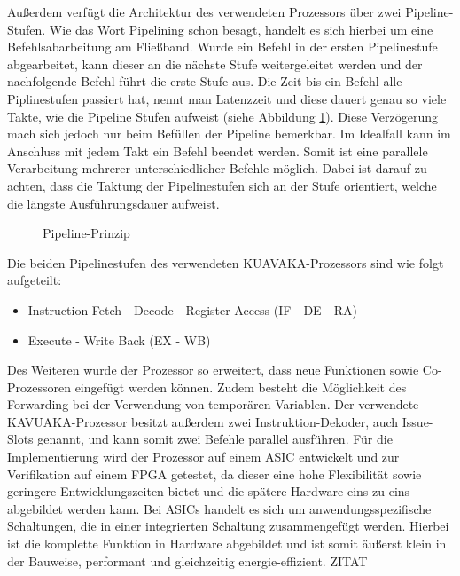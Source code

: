Außerdem verfügt die Architektur des verwendeten Prozessors über zwei Pipeline-Stufen.
Wie das Wort Pipelining schon besagt, handelt es sich hierbei um eine Befehlsabarbeitung am Fließband. Wurde ein Befehl in der ersten Pipelinestufe abgearbeitet, kann dieser an die nächste Stufe weitergeleitet werden und der nachfolgende Befehl führt die erste Stufe aus. Die Zeit bis ein Befehl alle Piplinestufen passiert hat, nennt man Latenzzeit und diese dauert genau so viele Takte, wie die Pipeline Stufen aufweist (siehe Abbildung \ref{fig:pipeline}). Diese Verzögerung mach sich jedoch nur beim Befüllen der Pipeline bemerkbar. Im Idealfall kann im Anschluss mit jedem Takt ein Befehl beendet werden. Somit ist eine parallele Verarbeitung mehrerer unterschiedlicher Befehle möglich. Dabei ist darauf zu achten, dass die Taktung der Pipelinestufen sich an der Stufe orientiert, welche die längste Ausführungsdauer aufweist. \cite[Seite 204]{wust2010mikroprozessortechnik}
	\begin{figure}[H] 
		\centering
		
		\caption{Pipeline-Prinzip}
		\label{fig:pipeline}
	\end{figure}
\newpage
Die beiden Pipelinestufen des verwendeten KUAVAKA-Prozessors sind wie folgt aufgeteilt:
\begin{itemize}
	\item[1.] Instruction Fetch - Decode - Register Access (IF - DE - RA) 
	\item[2.] Execute - Write Back (EX - WB)
\end{itemize}

Des Weiteren wurde der Prozessor so erweitert, dass neue Funktionen sowie Co-Prozessoren eingefügt werden können. Zudem besteht die Möglichkeit des Forwarding bei der Verwendung von temporären Variablen.
Der verwendete KAVUAKA-Prozessor besitzt außerdem zwei Instruktion-Dekoder, auch Issue-Slots genannt, und kann somit zwei Befehle parallel ausführen.
Für die Implementierung wird der Prozessor auf einem ASIC entwickelt und zur Verifikation auf einem FPGA getestet, da dieser eine hohe Flexibilität sowie geringere Entwicklungszeiten bietet und die spätere Hardware eins zu eins abgebildet werden kann.\cite{lukasglitches2017}
Bei ASICs handelt es sich um anwendungsspezifische Schaltungen, die in einer integrierten Schaltung zusammengefügt werden. Hierbei ist die komplette Funktion in Hardware abgebildet und ist somit äußerst klein in der Bauweise, performant und gleichzeitig energie-effizient. ZITAT


\newpage

